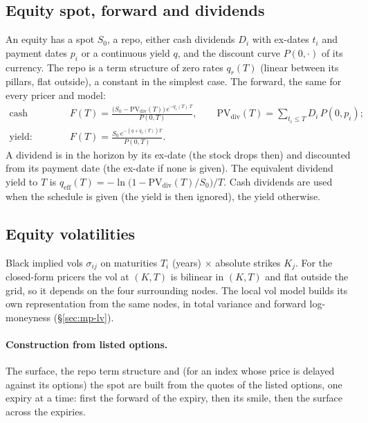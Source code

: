 \subsection{Equity spot, forward and dividends}\label{sec:mp-forward}
An equity has a spot $S_0$, a repo, either cash dividends $D_i$ with ex-dates $t_i$ and payment dates $p_i$ or a
continuous yield $q$, and the discount curve $P(0,\cdot)$ of its currency. The repo is a term structure of zero rates
$q_r(T)$ (linear between its pillars, flat outside), a constant in the simplest case. The forward, the same for every
pricer and model:
\begin{align*}
  \text{cash dividends:}\quad & F(T) = \frac{\big(S_0 - \mathrm{PV}_{\mathrm{div}}(T)\big)\,e^{-q_r(T)\,T}}{P(0,T)},\qquad
    \mathrm{PV}_{\mathrm{div}}(T) = \sum_{t_i \le T} D_i\,P(0,p_i); \\
  \text{yield:}\quad & F(T) = \frac{S_0\,e^{-(q + q_r(T))T}}{P(0,T)}.
\end{align*}
A dividend is in the horizon by its ex-date (the stock drops then) and discounted from its payment date (the ex-date
if none is given). The equivalent dividend yield to $T$ is $q_{\mathrm{eff}}(T) = -\ln\big(1 - \mathrm{PV}_{\mathrm{div}}(T)/S_0\big)/T$. Cash
dividends are used when the schedule is given (the yield is then ignored), the yield otherwise.

\subsection{Equity volatilities}\label{sec:mp-vol-surface}
Black implied vols $\sigma_{ij}$ on maturities $T_i$ (years) $\times$ absolute strikes $K_j$. For the closed-form pricers the vol at
$(K, T)$ is bilinear in $(K, T)$ and flat outside the grid, so it depends on the four surrounding nodes. The local vol model
builds its own representation from the same nodes, in total variance and forward log-moneyness (\S\ref{sec:mp-lv}).

\paragraph{Construction from listed options.} The surface, the repo term structure and (for an index whose price is
delayed against its options) the spot are built from the quotes of the listed options, one expiry at a time: first the
forward of the expiry, then its smile, then the surface across the expiries.

